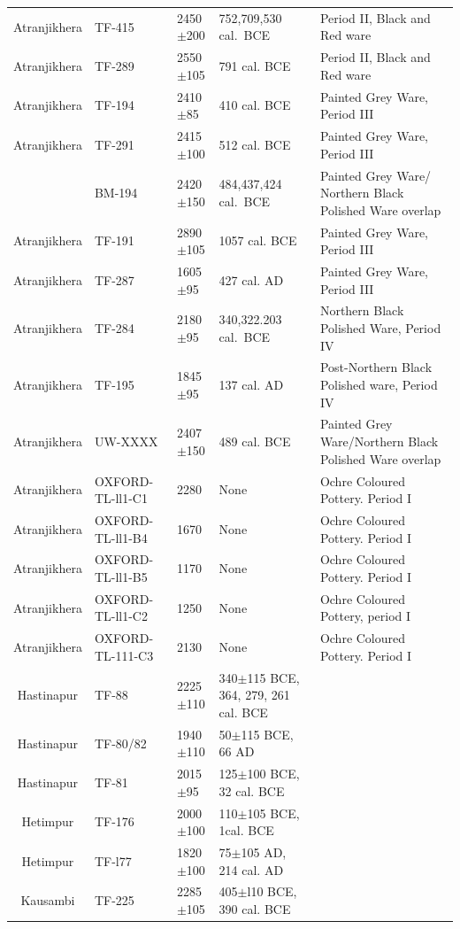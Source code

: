 {{{\begin{longtable}{|c|p{1.1cm}|p{1.2cm}|p{1.8cm}|p{3.3cm}|}
Atranjikhera & TF-415 & 2450$\pm$200 & 752,709,530 \hbox{cal. BCE} & Period II, Black and Red ware\\
Atranjikhera & TF-289 &2550$\pm$105 &791 cal. BCE &Period II, Black and Red ware\\
Atranjikhera & TF-194 & 2410$\pm$85 &410 cal. BCE &Painted Grey Ware, Period III\\
Atranjikhera & TF-291 &2415$\pm$100 & 512 cal. BCE &Painted Grey Ware, Period III\\
& BM-194 & 2420$\pm$150 & 484,437,424 \hbox{cal. BCE} & Painted Grey Ware/ Northern Black Polished Ware overlap\\
Atranjikhera & TF-191 & 2890$\pm$105 & 1057 cal. BCE & Painted Grey Ware, Period III\\
Atranjikhera & TF-287 & 1605$\pm$95 & 427 cal. AD &Painted Grey Ware, Period III\\
Atranjikhera & TF-284 & 2180$\pm$95 & 340,322.203 \hbox{cal. BCE} & Northern Black Polished Ware, Period IV\\
Atranjikhera & TF-195 & 1845$\pm$95 & 137 cal. AD & Post-Northern Black Polished ware, Period IV\\
Atranjikhera & UW-XXXX & 2407$\pm$150 & 489 cal. BCE & Painted Grey Ware/Northern Black Polished Ware overlap\\
Atranjikhera & OXFORD- TL-ll1-C1 & 2280 & None & Ochre Coloured Pottery. Period I\\
Atranjikhera & OXFORD- TL-ll1-B4 & 1670 & None & Ochre Coloured Pottery. Period I\\
Atranjikhera & OXFORD- TL-ll1-B5 & 1170 & None & Ochre Coloured Pottery. Period I\\
Atranjikhera & OXFORD- TL-ll1-C2 & 1250 & None & Ochre Coloured Pottery, period I\\
Atranjikhera & OXFORD- TL-111-C3 & 2130 & None & Ochre Coloured Pottery. Period I\\
Hastinapur & TF-88 & 2225$\pm$110 & 340$\pm$115 BCE, 364, 279, 261 cal. BCE &\\
Hastinapur & TF-80/82 & 1940$\pm$110 & 50$\pm$115 BCE, 66 AD &\\
Hastinapur & TF-81 & 2015$\pm$95 & 125$\pm$100 BCE, 32 cal. BCE &\\
Hetimpur & TF-176 & 2000$\pm$100 & 110$\pm$105 BCE, 1cal. BCE &\\
Hetimpur & TF-l77 & 1820$\pm$100 & 75$\pm$105 AD, 214 cal. AD &\\
Kausambi & TF-225 & 2285$\pm$105 & 405$\pm$l10 BCE, 390 cal. BCE &\\

\end{longtable}}}}
